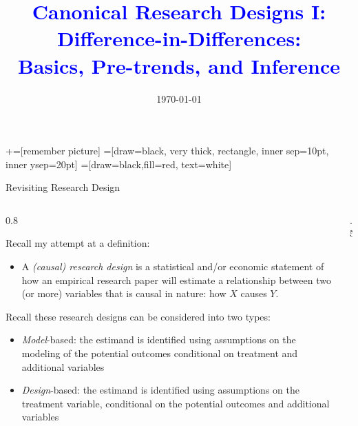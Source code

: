 \documentclass[notes,11pt, aspectratio=169]{beamer}
\title[]{\textcolor{blue}{Canonical Research Designs I:\\ Difference-in-Differences:\\ Basics, Pre-trends, and Inference}}
\author[PGP]{}
\institute[FRBNY]{\small{\begin{tabular}{c}
  Paul Goldsmith-Pinkham  \\
\end{tabular}}}
\date{\today}
\newenvironment{wideitemize}{\itemize\addtolength{\itemsep}{10pt}}{\enditemize}
\begin{document}
\newcommand\marktopleft[1]{%
	\tikz[overlay,remember picture]
	\node (marker-#1-a) at (-.3em,.3em) {};%
}
\newcommand\markbottomright[2]{%
	\tikz[overlay,remember picture]
	\node (marker-#1-b) at (0em,0em) {};%
}
+=[remember picture]
 =[draw=black, very thick, rectangle, inner sep=10pt, inner ysep=20pt]
 =[draw=black,fill=red, text=white]

\begin{frame}
	\maketitle
\end{frame}

\begin{frame}{Revisiting Research Design}
	\begin{columns}[T] %
		\begin{column}{0.8\textwidth}
			\begin{wideitemize}
				\item Recall my attempt at a definition:
				\begin{itemize}
					\item A \emph{(causal) research design} is a statistical and/or economic
					      statement of how an empirical research paper will estimate a
					      relationship between two (or more) variables that is causal in nature: how $X$ causes $Y$.
				\end{itemize}
				\item Recall these research designs can be considered into two types:
				\begin{itemize}
					\item \emph{Model}-based: the estimand is identified using
					      assumptions on the modeling of the potential outcomes
					      conditional on treatment and additional variables
					      \item\emph{Design}-based: the estimand is
					      identified using assumptions on the treatment variable,
					      conditional on the potential outcomes and additional
					      variables
				\end{itemize}
			\end{wideitemize}
		\end{column}%
		\hfill%
		\begin{column}{.5\textwidth}
		\end{column}%
	\end{columns}
\end{frame}
\end{document}
